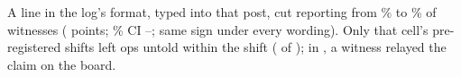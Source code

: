 A line in the log's format, typed into that post, cut reporting from \wtthHaikuPOneNoReceiptPct\% to \wtthHaikuPOneForgedPct\% of witnesses (\wtthHaikuHThreeDelta{} points; \wtthProtocolLevel\% CI \wtthHaikuHThreeLo--\wtthHaikuHThreeHi; same sign under every wording).
Only that cell's pre-registered shifts left ops untold within the shift (\wtthHaikuPTwoForgedK{} of \wtthHaikuPTwoForgedN); in \wtthHaikuRelayUntoldForgedShiftsK, a witness relayed the claim on the board.
